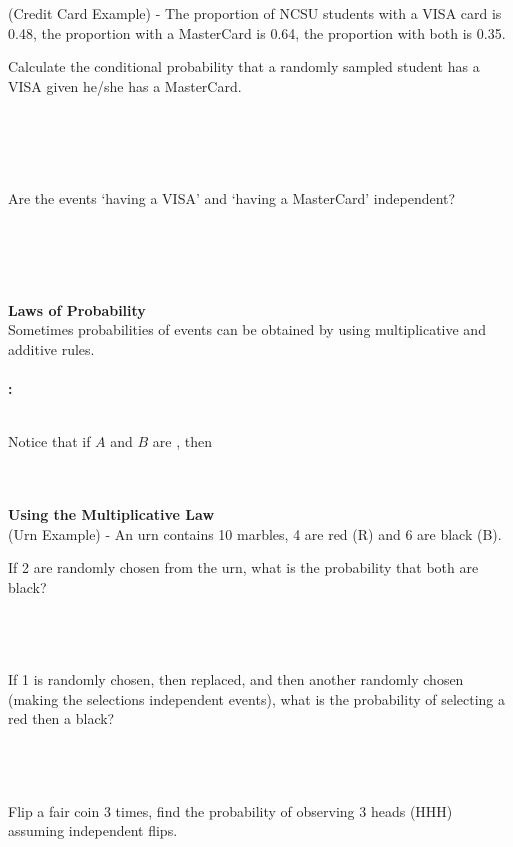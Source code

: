 \item (Credit Card Example) - The proportion of NCSU students with a VISA card is 0.48, the proportion with a MasterCard is 0.64, the proportion with both is 0.35.
\be
\item Calculate the conditional probability that a randomly sampled student has a VISA given he/she has a MasterCard.\\~\\~\\~\\~\\
\item Are the events `having a VISA' and `having a MasterCard' independent?\\~\\~\\~\\~\\
\ee
\ei

\textbf{Laws of Probability}\\
Sometimes probabilities of events can be obtained by using multiplicative and additive rules.\\~\\
\textbf{\underbar{~~~~~~~~~~~~~~~~~~~~~~~~~~~~~~~~~~~~~~~~~~~~~~~~~~~~~~~~}:}
\begin{center}
\end{center}
~\\
Notice that if $A$ and $B$ are \underbar{~~~~~~~~~~~~~~~~~~~~~~~~~~~~~~~~~~~~~~}, then\\
\begin{center}
\end{center}
~\\~\\

\textbf{Using the Multiplicative Law}\\
(Urn Example) - An urn contains 10 marbles, 4 are red (R) and 6 are black (B).
\be
\item If 2 are randomly chosen from the urn, what is the probability that both are black?\\~\\~\\~\\
\item If 1 is randomly chosen, then replaced, and then another randomly chosen (making the selections independent events), what is the probability of selecting a red then a black?\\~\\~\\~\\
\item Flip a fair coin 3 times, find the probability of observing 3 heads (HHH) assuming independent flips.
\ee

